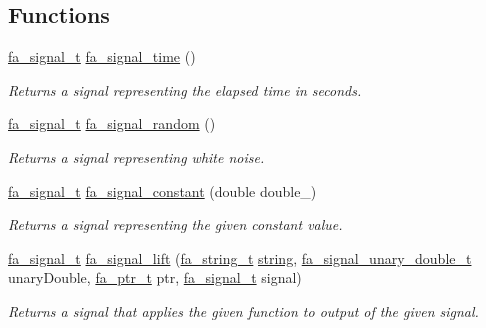 \subsection*{Functions}
\begin{DoxyCompactItemize}
\item 
\hyperlink{group___fa_signal_gac5c72f160cd6e93a6783551627b166e5}{fa\-\_\-signal\-\_\-t} \hyperlink{group___fa_signal_ga1884836b27b28547fcccdda085c6e947}{fa\-\_\-signal\-\_\-time} ()
\begin{DoxyCompactList}\small\item\em Returns a signal representing the elapsed time in seconds. \end{DoxyCompactList}\item 
\hyperlink{group___fa_signal_gac5c72f160cd6e93a6783551627b166e5}{fa\-\_\-signal\-\_\-t} \hyperlink{group___fa_signal_ga3e53efe955d4c0c931b6440765936117}{fa\-\_\-signal\-\_\-random} ()
\begin{DoxyCompactList}\small\item\em Returns a signal representing white noise. \end{DoxyCompactList}\item 
\hyperlink{group___fa_signal_gac5c72f160cd6e93a6783551627b166e5}{fa\-\_\-signal\-\_\-t} \hyperlink{group___fa_signal_ga7df7e39eda3a5207258d91c9a9658dcc}{fa\-\_\-signal\-\_\-constant} (double double\-\_\-)
\begin{DoxyCompactList}\small\item\em Returns a signal representing the given constant value. \end{DoxyCompactList}\item 
\hyperlink{group___fa_signal_gac5c72f160cd6e93a6783551627b166e5}{fa\-\_\-signal\-\_\-t} \hyperlink{group___fa_signal_gafd7d235d7ee945bf34227c94f9383cfc}{fa\-\_\-signal\-\_\-lift} (\hyperlink{group___fa_string_gacada63033b77bc6c39fa632ae199349b}{fa\-\_\-string\-\_\-t} \hyperlink{util_8h_a41106000aac73b61e4fc2ef9dd39a603}{string}, \hyperlink{group___fa_signal_gaced7eb8d67eb2fe39927934c4abc7255}{fa\-\_\-signal\-\_\-unary\-\_\-double\-\_\-t} unary\-Double, \hyperlink{group___fa_ga915ddeae99ad7568b273d2b876425197}{fa\-\_\-ptr\-\_\-t} ptr, \hyperlink{group___fa_signal_gac5c72f160cd6e93a6783551627b166e5}{fa\-\_\-signal\-\_\-t} signal)
\begin{DoxyCompactList}\small\item\em Returns a signal that applies the given function to output of the given signal. \end{DoxyCompactList}\item 

\end{DoxyCompactItemize}
